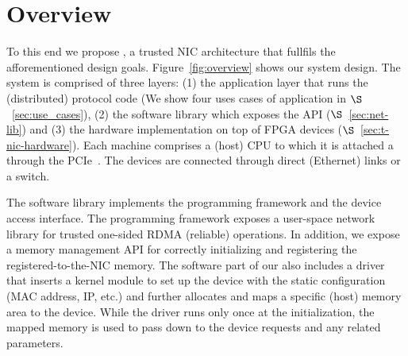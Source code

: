 
\section{Overview}
To this end we propose \projecttitle{}, a trusted NIC architecture that fullfils the afforementioned design goals. Figure~\ref{fig:overview} shows our \projecttitle{} system design. The system is comprised of three layers: (1) the application layer that runs the (distributed) protocol code (We show four uses cases of \projecttitle{} application in $\S$~\ref{sec:use_cases}), (2) the \projecttitle{} software library which exposes the \projecttitle{} API ($\S$~\ref{sec:net-lib}) and (3) the \projecttitle{} hardware implementation on top of FPGA devices ($\S$~\ref{sec:t-nic-hardware}). Each machine comprises a (host) CPU to which it is attached a \projecttitle{} through the PCIe~\cite{pcie}. The \projecttitle{} devices are connected through direct (Ethernet) links or a switch. %

The  \projecttitle{} software library implements the programming framework and the \projecttitle{} device access interface. The programming framework exposes a user-space network library for trusted one-sided RDMA (reliable) operations. In addition, we expose a memory management API for correctly initializing and registering the registered-to-the-NIC memory. The software part of our \projecttitle{} also includes a driver that inserts a kernel module to set up the device with the static configuration (MAC address, IP, etc.) and further allocates and maps a specific (host) memory area to the device. While the driver runs only once at the initialization, the mapped memory is used to pass down to the device requests and any related parameters. 


